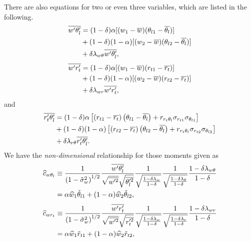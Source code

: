 There are also equations for two or even three variables, which are listed in the following.
\begin{align}
    \label{eq:w_prime_theta_l_prime_bar}
    \overline{w' \theta_l'}
    &= (1 - \delta) \alpha [(w_1 - \overline{w}) (\theta_{l1} - \overline{\theta_l})] \nonumber\\
    &+ (1 - \delta) (1 - \alpha) [(w_2 - \overline{w}) (\theta_{l2} - \overline{\theta_l})] \nonumber\\
    &+ \delta \lambda_{w\theta} \overline{w' \theta_l'},
\end{align}
\begin{align}
    \label{eq:w_prime_r_t_prime_bar}
    \overline{w' r_t'}
    &= (1 - \delta) \alpha [(w_1 - \overline{w}) (r_{t1} - \overline{r_t})] \nonumber\\
    &+ (1 - \delta) (1 - \alpha) [(w_2 - \overline{w}) (r_{t2} - \overline{r_t})] \nonumber\\
    &+ \delta \lambda_{wr} \overline{w' r_t'},
\end{align}
and
\begin{align}
    \label{eq:r_t_prime_theta_l_prime_bar}
    \overline{r_t' \theta_l'}
    &= (1 - \delta) \alpha \left[
        \left(r_{t1} - \overline{r_t}\right)
        \left(\theta_{l1} - \overline{\theta_l}\right) +
        r_{r_t \theta_l} \sigma_{r_{t1}} \sigma_{\theta_{l1}}
        \right] \nonumber\\
    &+ (1 - \delta) (1 - \alpha) \left[
        \left(r_{t2} - \overline{r_t}\right)
        \left(\theta_{l2} - \overline{\theta_l}\right) +
        r_{r_t \theta_l} \sigma_{r_{t2}} \sigma_{\theta_{l2}}
        \right] \nonumber\\
    &+ \delta \lambda_{r\theta} \overline{r_t' \theta_l'}.
\end{align}
We have the \emph{non-dimensional} relationship for those moments given as
\begin{align}
    \widehat{c}_{w \theta_l}
    &\equiv \frac{1}{\left( 1 - \tilde{\sigma}_w^2 \right)^{1/2}}
    \frac{\overline{w' \theta_l'}}{\sqrt{\overline{w'^2}}\sqrt{\overline{\theta_l'^2}}}
    \frac{1}{\sqrt{\frac{1 - \delta \lambda_w}{1 - \delta}}}
    \frac{1}{\sqrt{\frac{1 - \delta \lambda_\theta}{1 - \delta}}}
    \frac{1 - \delta \lambda_{w\theta}}{1 - \delta} \nonumber\\
    &= \alpha \widehat{w}_1 \tilde{\theta}_{l1} +
    (1 - \alpha) \widehat{w}_2 \tilde{\theta}_{l2},
    \label{eq:c_hat_w_theta_l_nondim}
\end{align}
\begin{align}
    \widehat{c}_{w r_t}
    &\equiv \frac{1}{\left( 1 - \tilde{\sigma}_w^2 \right)^{1/2}}
    \frac{\overline{w' r_t'}}{\sqrt{\overline{w'^2}}\sqrt{\overline{r_t'^2}}}
    \frac{1}{\sqrt{\frac{1 - \delta \lambda_w}{1 - \delta}}}
    \frac{1}{\sqrt{\frac{1 - \delta \lambda_r}{1-\delta}}}
    \frac{1 - \delta \lambda_{w r}}{1-\delta} \nonumber\\
    &= \alpha \widehat{w}_1 \tilde{r}_{t1} +
    (1 - \alpha) \widehat{w}_2 \tilde{r}_{t2},
    \label{eq:c_hat_w_r_t_nondim}
\end{align}
